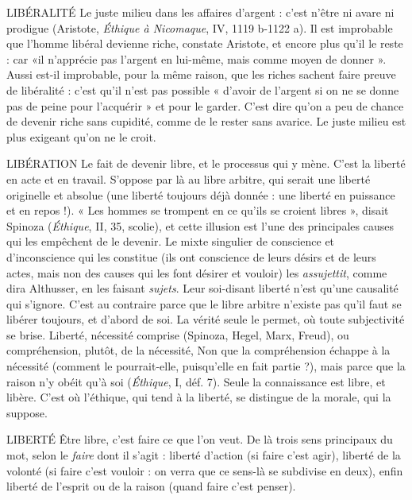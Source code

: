 {LIBÉRALITÉ Le juste milieu dans les affaires d’argent : c’est n'être ni avare
ni prodigue (Aristote, {\it Éthique à Nicomaque}, IV, 1119 b-1122 a).
Il est improbable que l’homme libéral devienne riche, constate Aristote, et
encore plus qu'il le reste : car «il n’apprécie pas l'argent en lui-même, mais
comme moyen de donner ». Aussi est-il improbable, pour la même raison, que
les riches sachent faire preuve de libéralité : c’est qu’il n’est pas possible
« d’avoir de l'argent si on ne se donne pas de peine pour l’acquérir » et pour le
garder. C’est dire qu’on a peu de chance de devenir riche sans cupidité, comme
de le rester sans avarice. Le juste milieu est plus exigeant qu’on ne le croit.

LIBÉRATION Le fait de devenir libre, et le processus qui y mène. C’est la
liberté en acte et en travail. S’oppose par là au libre arbitre,
qui serait une liberté originelle et absolue (une liberté toujours déjà donnée :
une liberté en puissance et en repos !). « Les hommes se trompent en ce qu’ils
se croient libres », disait Spinoza ({\it Éthique}, II, 35, scolie), et cette illusion est
l’une des principales causes qui les empêchent de le devenir. Le mixte singulier
de conscience et d’inconscience qui les constitue (ils ont conscience de leurs
désirs et de leurs actes, mais non des causes qui les font désirer et vouloir) les
{\it assujettit}, comme dira Althusser, en les faisant {\it sujets}. Leur soi-disant liberté
n'est qu'une causalité qui s’ignore. C’est au contraire parce que le libre arbitre
n'existe pas qu'il faut se libérer toujours, et d’abord de soi. La vérité seule le
permet, où toute subjectivité se brise. Liberté, nécessité comprise (Spinoza,
Hegel, Marx, Freud), ou compréhension, plutôt, de la nécessité, Non que la
compréhension échappe à la nécessité (comment le pourrait-elle, puisqu’elle en
fait partie ?), mais parce que la raison n’y obéit qu’à soi ({\it Éthique}, I, déf. 7).
Seule la connaissance est libre, et libère. C’est où l'éthique, qui tend à la liberté,
se distingue de la morale, qui la suppose.

LIBERTÉ Être libre, c’est faire ce que l’on veut. De là trois sens principaux
du mot, selon le {\it faire} dont il s’agit : liberté d’action (si faire c’est
agir), liberté de la volonté (si faire c’est vouloir : on verra que ce sens-là se subdivise
en deux), enfin liberté de l’esprit ou de la raison (quand faire c’est
penser).

}
